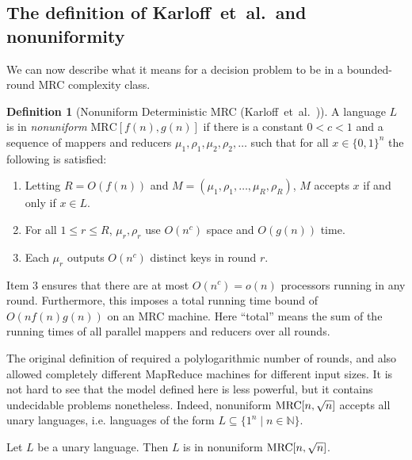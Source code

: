 \documentclass[letterpaper,USenglish]{lipics}
\theoremstyle{definition}
\newtheorem{defn}{Definition}
\theoremstyle{remark}
\newcommand{\N}{\mathbb{N}}
\newcommand{\mrc}{\textup{MRC}}
\begin{document}
\subsection{The definition of Karloff~et~al.~and nonuniformity}
\label{sec:nonuniform}

We can now describe what it means for a decision problem to be in a
bounded-round MRC complexity class.

\begin{defn}[Nonuniform Deterministic MRC (Karloff~et~al.~\cite{Karloff10})]
A language $L$ is in \emph{nonuniform} $\text{MRC}[f(n),g(n)]$ if there is a
constant $0 < c < 1$ and a sequence of mappers and reducers $\mu_1, \rho_1,
\mu_{2}, \rho_{2}, \ldots$ such that for all $x \in \{ 0,1 \}^n$ the following
is satisfied:
\begin{enumerate}
   \item Letting $R=O(f(n))$ and $M = (\mu_1, \rho_1, \dots, \mu_{R},
\rho_{R})$, $M$ accepts $x$ if and only if $x \in L$.
   \item For all $1 \leq r \leq R$, $\mu_r, \rho_r$ use $O(n^c)$ space and
$O(g(n))$ time.
   \item Each $\mu_r$ outputs $O(n^c)$ distinct keys in round $r$.
\end{enumerate}
\end{defn}

\begin{remark}
Item 3 ensures that there are at most $O(n^c) = o(n)$ processors running in any
round. Furthermore, this imposes a total running time bound of $O(nf(n)g(n))$
on an MRC machine. Here ``total'' means the sum of the running times of all
parallel mappers and reducers over all rounds.
\end{remark}

The original definition of \cite{Karloff10} required a polylogarithmic number
of rounds, and also allowed completely different MapReduce machines for
different input sizes. It is not hard to see that the model defined here is
less powerful, but it contains undecidable problems nonetheless. Indeed,
nonuniform $\mrc[n, \sqrt{n}]$ accepts all unary languages, i.e. languages of
the form $L \subseteq \{1^n \mid n \in \N\}$.

\begin{lemma}\label{lemma:unary}
Let $L$ be a unary language. Then $L$ is in nonuniform $\mrc[n, \sqrt{n}]$.
\end{lemma}
\end{document}
